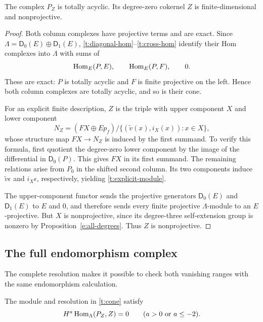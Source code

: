 \begin{lemma}\label{t:finite-module}
The complex $P_Z$ is totally acyclic.  Its degree-zero cokernel $Z$
is finite-dimensional and nonprojective.
\end{lemma}

\begin{proof}
Both column complexes have projective terms and are exact.  Since
$\Lambda=\mathsf D_0(E)\oplus\mathsf D_1(E)$,
\eqref{t:diagonal-hom}--\eqref{t:cross-hom} identify their Hom
complexes into $\Lambda$ with sums of
\[
 \operatorname{Hom}_E(P,E),\qquad\operatorname{Hom}_E(P,F),\qquad0.
\]
These are exact: $P$ is totally acyclic and $F$ is finite projective
on the left.  Hence both column complexes are totally acyclic, and
so is their cone.

For an explicit finite description, $Z$ is the triple with upper
component $X$ and lower component
\begin{equation}\label{t:explicit-module}
 N_Z=(FX\oplus Ep_f)
 \big/\{(\widetilde v(x),i_X(x)):x\in X\},
\end{equation}
whose structure map $FX\to N_Z$ is induced by the first summand.
To verify this formula, first quotient the degree-zero lower
component by the image of the differential in $\mathsf D_0(P)$.
This gives $FX$ in its first summand.  The remaining relations arise
from $P_0$ in the shifted second column.  Its two components induce
$\widetilde v\epsilon$ and $i_X\epsilon$, respectively, yielding
\eqref{t:explicit-module}.

The upper-component functor sends the projective generators
$\mathsf D_0(E)$ and $\mathsf D_1(E)$ to $E$ and $0$, and therefore
sends every finite projective $\Lambda$-module to an $E$-projective.
But $X$ is nonprojective, since its degree-three self-extension group
is nonzero by Proposition~\ref{e:all-degrees}.  Thus $Z$ is
nonprojective.
\end{proof}

\subsection{The full endomorphism complex}

The complete resolution makes it possible to check both vanishing
ranges with the same endomorphism calculation.

\begin{proposition}\label{t:vanishing}
The module and resolution in \eqref{t:cone} satisfy
\[
 H^a\operatorname{Hom}_\Lambda(P_Z,Z)=0
 \qquad(a>0\ \text{or}\ a\leq-2).
\]
\end{proposition}

